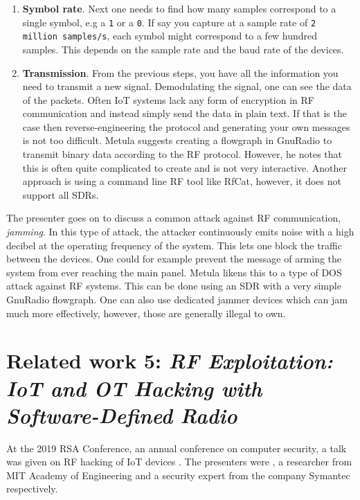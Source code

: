 \begin{enumerate}
    \item \textbf{Symbol rate}. Next one needs to find how many samples correspond to a single symbol, e.g a \texttt{1} or a \texttt{0}. If say you capture at a sample rate of \texttt{2 million samples/s}, each symbol might correspond to a few hundred samples. This depends on the sample rate and the baud rate of the devices.
    
    \item \textbf{Transmission}. From the previous steps, you have all the information you need to transmit a new signal. Demodulating the signal, one can see the data of the packets. Often IoT systems lack any form of encryption in RF communication and instead simply send the data in plain text. If that is the case then reverse-engineering the protocol and generating your own messages is not too difficult. Metula suggests creating a flowgraph in GnuRadio to transmit binary data according to the RF protocol. However, he notes that this is often quite complicated to create and is not very interactive. Another approach is using a command line RF tool like RfCat, however, it does not support all SDRs.
\end{enumerate}
The presenter goes on to discuss a common attack against RF communication, \textit{jamming}. In this type of attack, the attacker continuously emits noise with a high decibel at the operating frequency of the system. This lets one block the traffic between the devices. One could for example prevent the message of arming the system from ever reaching the main panel. Metula likens this to a type of \gls{DOS} attack against RF systems. This can be done using an SDR with a very simple GnuRadio flowgraph. One can also use dedicated jammer devices which can jam much more effectively, however, those are generally illegal to own.

\section{Related work 5: \textit{RF Exploitation: IoT and OT Hacking with Software-Defined Radio}} \label{ch:related-work:rf-exploit}
At the 2019 RSA Conference, an annual conference on computer security, a talk was given on RF hacking of IoT devices \cite{rf-exploitation-talk}. The presenters were \citeauthor{rf-exploitation-talk}, a researcher from MIT Academy of Engineering and a security expert from the company Symantec respectively.

